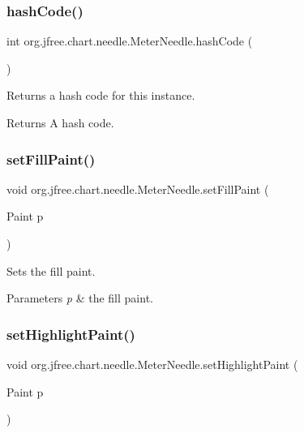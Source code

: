 \subsubsection{\texorpdfstring{hash\+Code()}{hashCode()}}
{\footnotesize\ttfamily int org.\+jfree.\+chart.\+needle.\+Meter\+Needle.\+hash\+Code (\begin{DoxyParamCaption}{ }\end{DoxyParamCaption})}

Returns a hash code for this instance.

\begin{DoxyReturn}{Returns}
A hash code. 
\end{DoxyReturn}
\mbox{\label{classorg_1_1jfree_1_1chart_1_1needle_1_1_meter_needle_abddc23c476734530a5efae98d75fab9e}} 
\subsubsection{\texorpdfstring{set\+Fill\+Paint()}{setFillPaint()}}
{\footnotesize\ttfamily void org.\+jfree.\+chart.\+needle.\+Meter\+Needle.\+set\+Fill\+Paint (\begin{DoxyParamCaption}\item[{Paint}]{p }\end{DoxyParamCaption})}

Sets the fill paint.


\begin{DoxyParams}{Parameters}
{\em p} & the fill paint. \\
\hline
\end{DoxyParams}
\mbox{\label{classorg_1_1jfree_1_1chart_1_1needle_1_1_meter_needle_a0b2d30a4985c06f63f9d8276f6f8cac6}} 
\subsubsection{\texorpdfstring{set\+Highlight\+Paint()}{setHighlightPaint()}}
{\footnotesize\ttfamily void org.\+jfree.\+chart.\+needle.\+Meter\+Needle.\+set\+Highlight\+Paint (\begin{DoxyParamCaption}\item[{Paint}]{p }\end{DoxyParamCaption})}

